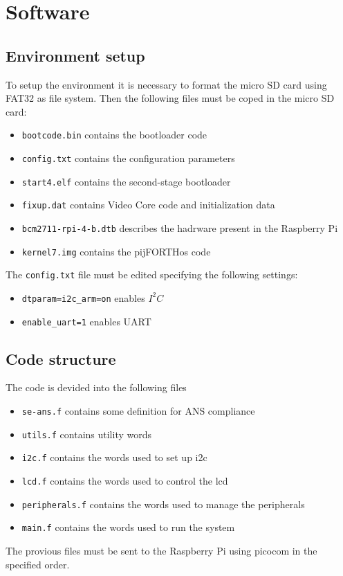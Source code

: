 \documentclass[]{article}
\begin{document}
\section{Software}

\subsection{Environment setup}
To setup the environment it is necessary to format the micro SD card using FAT32 as file system. Then the following files must be coped in the micro SD card: 
\begin{itemize}
    \item \texttt{bootcode.bin} contains the bootloader code 
    \item \texttt{config.txt} contains the configuration parameters
    \item \texttt{start4.elf} contains the second-stage bootloader 
    \item \texttt{fixup.dat} contains Video Core code and initialization data 
    \item \texttt{bcm2711-rpi-4-b.dtb} describes the hadrware present in the Raspberry Pi
    \item \texttt{kernel7.img} contains the pijFORTHos code   
\end{itemize}
The \texttt{config.txt} file must be edited specifying the following settings:
\begin{itemize}
    \item \texttt{dtparam=i2c\_arm=on} enables $ I^2C $
    \item \texttt{enable\_uart=1} enables UART 
\end{itemize}

\subsection{Code structure}
The code is devided into the following files 

\begin{itemize}
    \item \texttt{se-ans.f} contains some definition for ANS compliance 
    \item \texttt{utils.f} contains utility words
    \item \texttt{i2c.f} contains the words used to set up i2c 
    \item \texttt{lcd.f} contains the words used to control the lcd
    \item \texttt{peripherals.f} contains the words used to manage the peripherals
    \item \texttt{main.f} contains the words used to run the system 
\end{itemize}
The provious files must be sent to the Raspberry Pi using picocom in the specified order.
\end{document}
